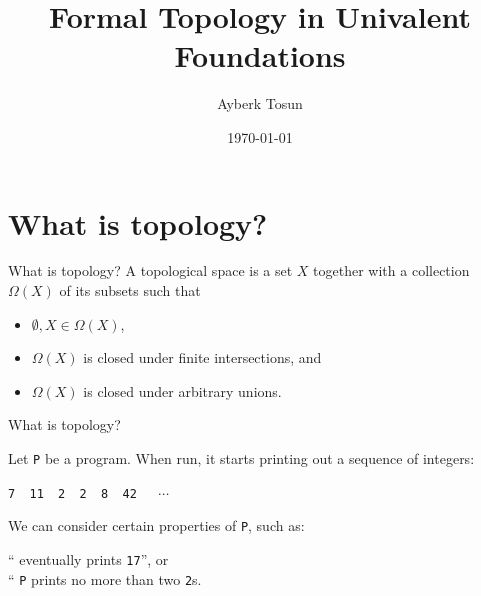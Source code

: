 \documentclass[xcolor={dvipsnames}]{beamer}
\title{Formal Topology in Univalent Foundations}
\date{\today}
\author{Ayberk Tosun}
\institute{Chalmers University of Technology}
\newcommand{\fnname}[1]{{\color{codecolour} {\tt #1}}}
\newcommand{\prgoutput}[1]{{\color{codecolour} {\tt #1}}}
\begin{document}
\maketitle

\section{What is topology?}

\begin{frame}{What is topology?}
  \large
  A topological space is a set $X$ together with a collection $\Omega(X)$ of its subsets
  such that
  \begin{itemize}
    \item $\emptyset, X \in \Omega(X)$,
    \item $\Omega(X)$ is closed under \alert{finite} intersections, and
    \item $\Omega(X)$ is closed under \alert{arbitrary} unions.
  \end{itemize}
\end{frame}

\begin{frame}[c]{What is topology?}
  \large
  \vspace{3em}

  Let \fnname{P} be a program. When run, it starts printing out a sequence of integers:

  \begin{center}
  \prgoutput{7~~11~~2~~2~~8~~42~~}~$\cdots$
  \end{center}

  We can consider certain properties of \fnname{P}, such as:
  \begin{center}
    ``\tikzmarknode{a}{\fnname{P}} eventually prints \fnname{17}'', or\\
    \vspace{1em}
    ``\fnname{P} prints no more than two \fnname{2}s.
  \end{center}

\end{frame}
\end{document}

